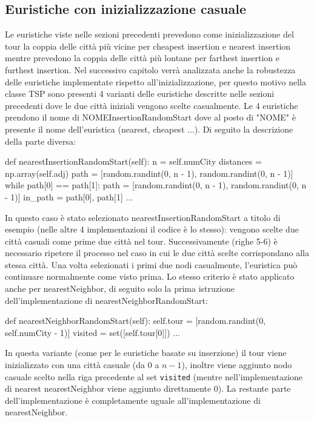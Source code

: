 \documentclass[a4paper,12pt]{report}
\begin{document}
\subsection{Euristiche con inizializzazione casuale}
Le euristiche viste nelle sezioni precedenti prevedono come inizializzazione del tour la coppia delle città più vicine per cheapest insertion e nearest insertion mentre prevedono la coppia delle città più lontane per farthest insertion e furthest insertion. Nel successivo capitolo verrà analizzata anche la robustezza delle euristiche implementate rispetto all'inizializzazione, per questo motivo nella classe TSP sono presenti 4 varianti delle euristiche descritte nelle sezioni precedenti dove le due città iniziali vengono scelte casualmente. Le 4 euristiche prendono il nome di NOMEInsertionRandomStart dove al posto di "NOME" è presente il nome dell'euristica (nearest, cheapest ...). Di seguito la descrizione della parte diversa:
\begin{python}
def nearestInsertionRandomStart(self):
  n = self.numCity
  distances = np.array(self.adj)
  path = [random.randint(0, n - 1), random.randint(0, n - 1)]
  while path[0] == path[1]:
    path = [random.randint(0, n - 1), random.randint(0, n - 1)]
  in_path = {path[0], path[1]}
  ...
\end{python}
In questo caso è stato selezionato nearestInsertionRandomStart a titolo di esempio (nelle altre 4 implementazioni il codice è lo stesso): vengono scelte due città casuali come prime due città nel tour. Successivamente (righe 5-6) è necessario ripetere il processo nel caso in cui le due città scelte corrispondano alla stessa città. Una volta selezionati i primi due nodi casualmente, l'euristica può continuare normalmente come visto prima.
Lo stesso criterio è stato applicato anche per nearestNeighbor, di seguito solo la prima istruzione dell'implementazione di nearestNeighborRandomStart:
\begin{python}
def nearestNeighborRandomStart(self):
  self.tour = [random.randint(0, self.numCity - 1)]
  visited = set([self.tour[0]])
  ...
\end{python}
In questa variante (come per le euristiche basate su inserzione) il tour viene inizializzato con una città casuale (da 0 a $n - 1$), inoltre viene aggiunto nodo casuale scelto nella riga precedente al set \lstinline!visited! (mentre nell'implementazione di nearest nearestNeighbor viene aggiunto direttamente 0). La restante parte dell'implementazione è completamente uguale all'implementazione di nearestNeighbor.
\end{document}
